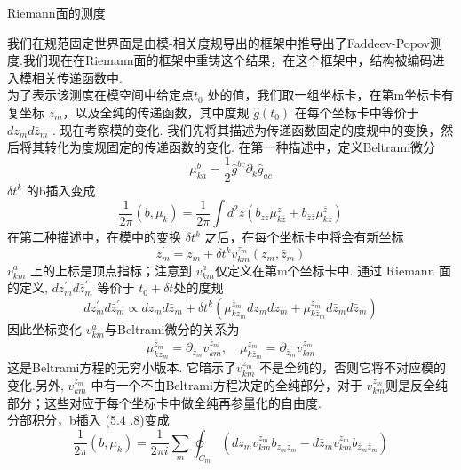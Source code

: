 \centerline{\Large Riemann面的测度}
我们在规范固定世界面是由模-相关度规导出的框架中推导出了Faddeev-Popov测度.我们现在在Riemann面的框架中重铸这个结果，在这个框架中，结构被编码进入模相关传递函数中.\\
为了表示该测度在模空间中给定点$t_{0}$ 处的值，我们取一组坐标卡，在第m坐标卡有复坐标 $z_{m}$，以及全纯的传递函数，其中度规 $\hat{g}\left(t_{0}\right)$ 在每个坐标卡中等价于$d z_{m} d \bar{z}_{m}$ . 现在考察模的变化. 我们先将其描述为传递函数固定的度规中的变换，然后将其转化为度规固定的传递函数的变化. 在第一种描述中，定义Beltrami微分
\begin{equation}
	\mu_{k a}^{b}=\frac{1}{2} \hat{g}^{b c} \partial_{k} \hat{g}_{a c}
\end{equation}
 $\delta t^{k}$ 的b插入变成
\begin{equation}
	\frac{1}{2 \pi}\left(b, \mu_{k}\right)=\frac{1}{2 \pi} \int d^{2} z\left(b_{z z} \mu_{k \bar{z}}^{z}+b_{\bar{z} \bar{z}} \mu_{k z}^{\bar{z}}\right)
\end{equation}
在第二种描述中，在模中的变换 $\delta t^{k}$ 之后，在每个坐标卡中将会有新坐标
\begin{equation}
	z_{m}^{\prime}=z_{m}+\delta t^{k} v_{k m}^{z_{m}}\left(z_{m}, \bar{z}_{m}\right)
\end{equation}
$v_{k m}^{a}$ 上的上标是顶点指标；注意到 $v_{k m}^{a}$仅定义在第m个坐标卡中. 通过 Riemann 面的定义, $d z_{m}^{\prime} d \bar{z}_{m}^{\prime}$ 等价于 $t_{0}+\delta t$处的度规
\begin{equation}
	d z_{m}^{\prime} d \bar{z}_{m}^{\prime} \propto d z_{m} d \bar{z}_{m}+\delta t^{k}\left(\mu_{k z_{m}}^{\bar{z}_{m}} d z_{m} d z_{m}+\mu_{k \bar{z}_{m}}^{z_{m}} d \bar{z}_{m} d \bar{z}_{m}\right)
\end{equation}
因此坐标变化 $v_{k m}^{a}$与Beltrami微分的关系为
\begin{equation}
	\mu_{k z_{m}}^{\overline{\bar{z}}_{m}}=\partial_{z_{m}} v_{k m}^{\bar{z}_{m}}, \quad \mu_{k \bar{z}_{m}}^{z_{m}}=\partial_{\bar{z}_{m}} v_{k m}^{z_{m}}
\end{equation}
这是Beltrami方程的无穷小版本. 它暗示了$v_{k m}^{z_{m}}$ 不是全纯的，否则它将不对应模的变化.另外, $v_{k m}^{z_{m}}$ 中有一个不由Beltrami方程决定的全纯部分，对于 $v_{k m}^{\bar{z}_{m}}$则是反全纯部分；这些对应于每个坐标卡中做全纯再参量化的自由度.\\
分部积分，b插入 (5.4 .8)变成
\begin{equation}
	\frac{1}{2 \pi}\left(b, \mu_{k}\right)=\frac{1}{2 \pi i} \sum_{m} \oint_{C_{m}}\left(d z_{m} v_{k m}^{z_{m}} b_{z_{m} z_{m}}-d \bar{z}_{m} v_{k m}^{\bar{z}_{m}} b_{\bar{z}_{m} \bar{z}_{m}}\right)
\end{equation}
